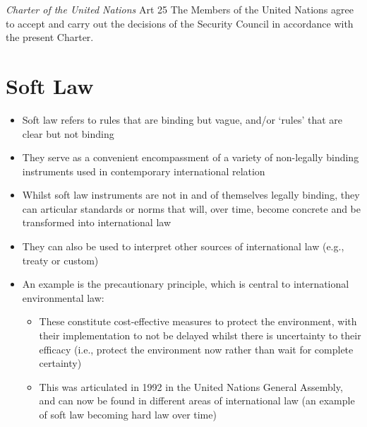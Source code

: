 \begin{conventiondetails}{\textit{Charter of the United Nations} Art 25}
    \flushleft
    The Members of the United Nations agree to accept and carry out the decisions of the Security Council in accordance with the present Charter.
\end{conventiondetails}

\section{Soft Law}
\begin{itemize}
    \item Soft law refers to rules that are binding but vague, and/or `rules' that are clear but not binding
    \item They serve as a convenient encompassment of a variety of non-legally binding instruments used in contemporary international relation
    \item Whilst soft law instruments are not in and of themselves legally binding, they can articular standards or norms that will, over time, become concrete and be transformed into international law
    \item They can also be used to interpret other sources of international law (e.g., treaty or custom)
    \item An example is the precautionary principle, which is central to international environmental law:
    \begin{itemize}
        \item These constitute cost-effective measures to protect the environment, with their implementation to not be delayed whilst there is uncertainty to their efficacy (i.e., protect the environment now rather than wait for complete certainty)
        \item This was articulated in 1992 in the United Nations General Assembly, and can now be found in different areas of international law (an example of soft law becoming hard law over time)
    \end{itemize}
\end{itemize}